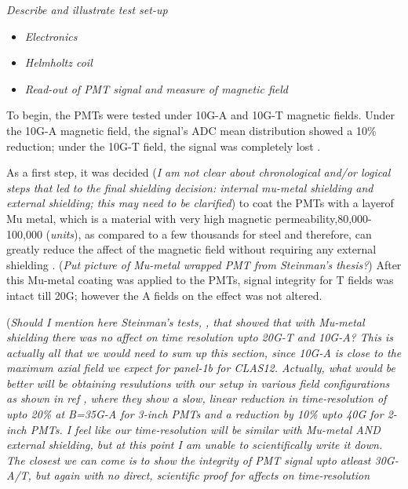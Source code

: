 \documentclass[12pt]{article}
\begin{document}
\textit{Describe and illustrate test set-up}
\begin{itemize}
	\item \textit{Electronics}
	\item \textit{Helmholtz coil}
	\item \textit{Read-out of PMT signal and measure of magnetic field}
\end{itemize}

To begin, the PMTs were tested under 10G-A and 10G-T magnetic fields. Under the 10G-A magnetic field, the signal's ADC mean distribution showed a 10\% reduction; under the 10G-T field, the signal was completely lost \cite{Steinman}.

As a first step, it was decided (\textit{I am not clear about chronological and/or logical steps that led to the final shielding decision: internal mu-metal shielding and external shielding; this may need to be clarified}) to coat the PMTs with a layerof Mu metal, which is a material with very high magnetic permeability,80,000-100,000 (\textit{units}), as compared to a few thousands for steel and therefore, can greatly reduce the affect of the magnetic field without requiring any external shielding \cite{Steinman}. (\textit{Put picture of Mu-metal wrapped PMT from Steinman's thesis?}) After this Mu-metal coating was applied to the PMTs, signal integrity for T fields was intact till 20G; however the A fields on the effect was not altered.

(\textit{Should I mention here Steinman's tests, \cite{Steinman}, that showed that with Mu-metal shielding there was no affect on time resolution upto 20G-T and 10G-A? This is actually all that we would need to sum up this section, since 10G-A is close to the maximum axial field we expect for panel-1b for CLAS12. Actually, what would be better will be obtaining resulutions with our setup in various field configurations as shown in ref \cite{CLAS12FTOFstudies}, where they show a slow, linear reduction in time-resolution of upto 20\% at B=35G-A for 3-inch PMTs and a reduction by 10\% upto 40G for 2-inch PMTs. I feel like our time-resolution will be similar with Mu-metal AND external shielding, but at this point I am unable to scientifically write it down. The closest we can come is to show the integrity of PMT signal upto atleast 30G-A/T, but again with no direct, scientific proof for affects on time-resolution }
\end{document}
